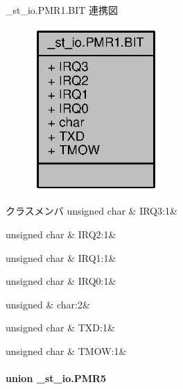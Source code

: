 \+\_\+st\+\_\+io.\+P\+M\+R1.\+B\+I\+T 連携図
\nopagebreak
\begin{figure}[H]
\begin{center}
\leavevmode
\includegraphics[width=136pt]{dc/dd3/struct__st__io_8PMR1_8BIT__coll__graph}
\end{center}
\end{figure}
\begin{DoxyFields}{クラスメンバ}
unsigned char\label{3694s_8h_a11a2d78432ca2f8a1b520844f307b8fa}
&
I\+R\+Q3\+:1&
\\
\hline

unsigned char\label{3694s_8h_a35649e6b3c7065a802c6846add9a301f}
&
I\+R\+Q2\+:1&
\\
\hline

unsigned char\label{3694s_8h_aa1af3bd1499a8ba1eb503f47548140ce}
&
I\+R\+Q1\+:1&
\\
\hline

unsigned char\label{3694s_8h_a0f7e94535a697e1578c10ff11fac6515}
&
I\+R\+Q0\+:1&
\\
\hline

unsigned\label{3694s_8h_aa87deb01c5f539e6bda34829c8ef2368}
&
char\+:2&
\\
\hline

unsigned char\label{3694s_8h_a039f69bf4c6e4a6b96df27b2e2a6cb3d}
&
T\+X\+D\+:1&
\\
\hline

unsigned char\label{3694s_8h_ab9d32afc16d865e0e55995183e73c389}
&
T\+M\+O\+W\+:1&
\\
\hline

\end{DoxyFields}
\label{union__st__io_8PMR5}
\paragraph{union \+\_\+st\+\_\+io.\+P\+M\+R5}


